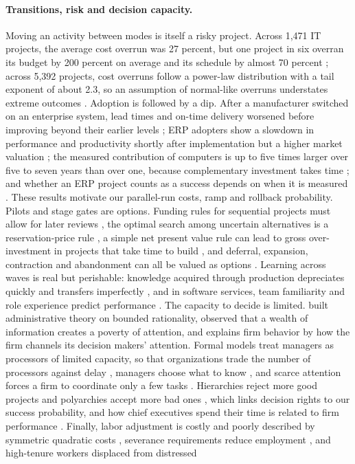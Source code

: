 \paragraph{Transitions, risk and decision capacity.} Moving an activity between modes is itself a risky project. Across 1,471 IT projects, the average cost overrun was 27 percent, but one project in six overran its budget by 200 percent on average and its schedule by almost 70 percent \citep{flyvbjerg2011why}; across 5,392 projects, cost overruns follow a power-law distribution with a tail exponent of about 2.3, so an assumption of normal-like overruns understates extreme outcomes \citep{flyvbjerg2022empirical}. Adoption is followed by a dip. After a manufacturer switched on an enterprise system, lead times and on-time delivery worsened before improving beyond their earlier levels \citep{mcafee2002impact}; ERP adopters show a slowdown in performance and productivity shortly after implementation but a higher market valuation \citep{hitt2002investment}; the measured contribution of computers is up to five times larger over five to seven years than over one, because complementary investment takes time \citep{brynjolfsson2003computing}; and whether an ERP project counts as a success depends on when it is measured \citep{markus2000learning}. These results motivate our parallel-run costs, ramp and rollback probability. Pilots and stage gates are options. Funding rules for sequential projects must allow for later reviews \citep{roberts1981funding}, the optimal search among uncertain alternatives is a reservation-price rule \citep{weitzman1979optimal}, a simple net present value rule can lead to gross over-investment in projects that take time to build \citep{majd1987time}, and deferral, expansion, contraction and abandonment can all be valued as options \citep{trigeorgis1996real,dixit1994investment}. Learning across waves is real but perishable: knowledge acquired through production depreciates quickly and transfers imperfectly \citep{argote1990persistence,darr1995acquisition}, and in software services, team familiarity and role experience predict performance \citep{huckman2009team}. The capacity to decide is limited. \citet{simon1947administrative} built administrative theory on bounded rationality, \citet{simon1971designing} observed that a wealth of information creates a poverty of attention, and \citet{ocasio1997towards} explains firm behavior by how the firm channels its decision makers' attention. Formal models treat managers as processors of limited capacity, so that organizations trade the number of processors against delay \citep{radner1993organization,vanzandt1999realtime}, managers choose what to know \citep{geanakoplos1991theory}, and scarce attention forces a firm to coordinate only a few tasks \citep{dessein2016rational}. Hierarchies reject more good projects and polyarchies accept more bad ones \citep{sah1986architecture}, which links decision rights to our success probability, and how chief executives spend their time is related to firm performance \citep{bandiera2020ceo}. Finally, labor adjustment is costly and poorly described by symmetric quadratic costs \citep{hamermesh1996adjustment}, severance requirements reduce employment \citep{lazear1990job}, and high-tenure workers displaced from distressed 